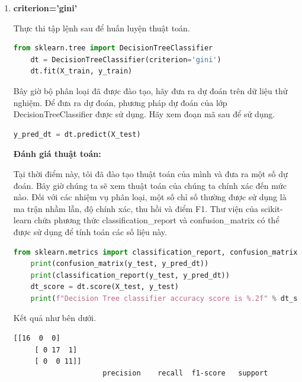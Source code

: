 \begin{enumerate}[label=(\alph*)]
    \item \textbf{criterion='gini'}
    
    Thực thi tập lệnh sau để huấn luyện thuật toán.
    
    \begin{center}
    \begin{lstlisting}[language=Python,breaklines=true]
    from sklearn.tree import DecisionTreeClassifier  
    dt = DecisionTreeClassifier(criterion='gini')  
    dt.fit(X_train, y_train)
    \end{lstlisting}
    \end{center}

    Bây giờ bộ phân loại đã được đào tạo, hãy đưa ra dự đoán trên dữ liệu thử nghiệm. Để đưa ra dự đoán, phương pháp dự đoán của lớp DecisionTreeClassifier được sử dụng. Hãy xem đoạn mã sau để sử dụng.
    
    \begin{center}
    \begin{lstlisting}[language=Python,breaklines=true]
    y_pred_dt = dt.predict(X_test)
    \end{lstlisting}
    \end{center}

    \textbf{Đánh giá thuật toán:}
    
    Tại thời điểm này, tôi đã đào tạo thuật toán của mình và đưa ra một số dự đoán. Bây giờ chúng ta sẽ xem thuật toán của chúng ta chính xác đến mức nào. Đối với các nhiệm vụ phân loại, một số chỉ số thường được sử dụng là ma trận nhầm lẫn, độ chính xác, thu hồi và điểm F1. Thư viện của scikit-learn chứa phương thức classification\_report và confusion\_matrix có thể được sử dụng để tính toán các số liệu này.
    
    \begin{center}
    \begin{lstlisting}[language=Python,breaklines=true]
    from sklearn.metrics import classification_report, confusion_matrix
    print(confusion_matrix(y_test, y_pred_dt))
    print(classification_report(y_test, y_pred_dt))
    dt_score = dt.score(X_test, y_test)
    print(f"Decision Tree classifier accuracy score is %.2f" % dt_score)
    \end{lstlisting}
    \end{center}

    Kết quả như bên dưới.
    
    \begin{center}
    \begin{lstlisting}[basicstyle=\fontsize{11}{13}\selectfont\ttfamily]
    [[16  0  0]
     [ 0 17  1]
     [ 0  0 11]]
                     precision    recall  f1-score   support
    

\end{lstlisting}
\end{center}
\end{enumerate}
